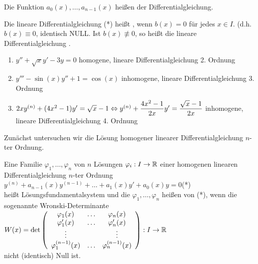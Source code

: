 Die Funktion $a_0(x),\ldots,a_{n-1}(x)$ heißen  der Differentialgleichung.

Die lineare Differentialgleichung (*) heißt , wenn $b(x)=0$ für jedes $x\in I$. (d.h. $b(x)\equiv0$, {\flqq identisch NULL\frqq}. Ist $b(x)\not\equiv0$, so heißt die lineare Differentialgleichung .

\Bsp\quad
\begin{enumerate}
	\item $y''+\sqrt{x}y'-3y=0$ \qquad homogene, lineare Differentialgleichung 2. Ordnung
	
	\item $y'''-\sin(x)y''+1=\cos(x)$ \qquad inhomogene, lineare Differentialgleichung 3. Ordnung
	
	\item $2xy^{(n)}+(4x^2-1)y'=\sqrt{x}-1\\
	\Leftrightarrow y^{(n)}+\dfrac{4x^2-1}{2x}y'=\dfrac{\sqrt{x}-1}{2x}$ \qquad inhomogene, lineare Differentialgleichung 4. Ordnung
\end{enumerate}


Zunächst untersuchen wir die Lösung homogener linearer Differentialgleichung $n$-ter Ordnung.

\Def Eine Familie $\varphi_1,\ldots,\varphi_n$ von $n$ Lösungen $\varphi_i:I\to\mathbb{R}$ einer homogenen linearen Differentialgleichung $n$-ter Ordnung\\
\hhspace{2cm}$y^{(n)}+a_{n-1}(x)y^{(n-1)}+\ldots+a_1(x)y'+a_0(x)y=0$\quad (*)\\
heißt Lösungsfundamentalsystem und die $\varphi_1,\ldots,\varphi_n$ heißen  von (*), wenn die sogenannte Wronski-Determinante\\
\hhspace{2cm}$W(x)=\det\left(\begin{array}{ccc}
\varphi_1(x)&\dots&\varphi_n(x)\\
\varphi'_1(x)&\dots&\varphi'_n(x)\\
\vdots&&\vdots\\
\varphi^{(n-1)}_1(x)&\dots&\varphi^{(n-1)}_n(x)
\end{array}\right):I\to\mathbb{R}$\\
nicht (identisch) Null ist.


